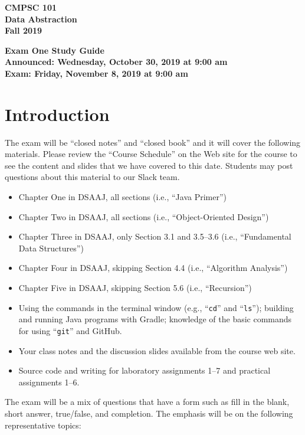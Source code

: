 \documentclass[11pt]{article}
\newcommand{\assignmentduedate}{November 8}
\newcommand{\assignmentassignedate}{October 30}
\newcommand{\assignmentnumber}{One}
\newcommand{\labyear}{2019}
\newcommand{\assignedday}{Wednesday}
\newcommand{\dueday}{Friday}
\newcommand{\labtime}{9:00 am}
\newcommand{\assigneddate}{Announced: \assignedday, \assignmentassignedate, \labyear{} at \labtime{}}
\newcommand{\duedate}{Exam: \dueday, \assignmentduedate, \labyear{} at \labtime{}}
\newcommand{\command}[1]{``\lstinline{#1}''}
\newcommand{\guidetitle}[1]
{
  \begin{center}
    \begin{center}
      \bf
      CMPSC 101\\Data Abstraction\\
      Fall 2019\\
      \medskip
    \end{center}
    \bf
    #1
  \end{center}
}
\begin{document}
\thispagestyle{empty}

\guidetitle{Exam \assignmentnumber{} Study Guide \\ \assigneddate{} \\ \duedate{}}

\section*{Introduction}

\noindent The exam will be ``closed notes'' and ``closed book'' and it will
cover the following materials. Please review the ``Course Schedule'' on the Web
site for the course to see the content and slides that we have covered to this
date. Students may post questions about this material to our Slack team.

\begin{itemize}

  \itemsep 0in

  \item Chapter One in DSAAJ, all sections (i.e., ``Java Primer'')

  \item Chapter Two in DSAAJ, all sections (i.e., ``Object-Oriented Design'')

  \item Chapter Three in DSAAJ, only Section 3.1 and 3.5--3.6 (i.e.,
    ``Fundamental Data Structures'')

  \item Chapter Four in DSAAJ, skipping Section 4.4 (i.e., ``Algorithm Analysis'')

  \item Chapter Five in DSAAJ, skipping Section 5.6 (i.e., ``Recursion'')

  \item Using the commands in the terminal window (e.g., \command{cd} and
    \command{ls}); building and running Java programs with Gradle; knowledge of
    the basic commands for using \command{git} and GitHub.

  \item Your class notes and the discussion slides available from the course web
    site.

  \item Source code and writing for laboratory assignments 1--7 and practical
    assignments 1--6.

\end{itemize}

\noindent The exam will be a mix of questions that have a form such as fill in
the blank, short answer, true/false, and completion. The emphasis will be on the
following representative topics:
\end{document}

